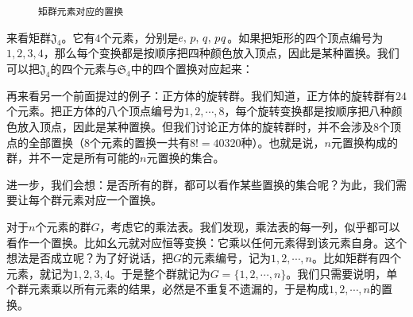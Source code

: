 \documentclass[12pt,UTF8,fontset=none]{ctexbook}
\begin{document}
\begin{figure}[htbp]
    \caption{\texttt{矩群元素对应的置换}}
    \label{fig:PermutationRecta}
\end{figure}
\vspace{12pt}

来看矩群$\mathfrak{J}_4$。它有$4$个元素，分别是$e,\, p, \,q,\, p\hspace{0.5pt}q$。如果把矩形的四个顶点编号为$1,2,3,4$，那么每个变换都是按顺序把四种颜色放入顶点，因此是某种置换。我们可以把$\mathfrak{J}_4$的四个元素与$\mathfrak{S}_4$中的四个置换对应起来：

再来看另一个前面提过的例子：正方体的旋转群。我们知道，正方体的旋转群有$24$个元素。把正方体的八个顶点编号为$1,2,\cdots,8$，每个旋转变换都是按顺序把八种颜色放入顶点，因此是某种置换。但我们讨论正方体的旋转群时，并不会涉及$8$个顶点的全部置换（$8$个元素的置换一共有$8! = 40320$种）。也就是说，$n$元置换构成的群，并不一定是所有可能的$n$元置换的集合。

进一步，我们会想：是否所有的群，都可以看作某些置换的集合呢？为此，我们需要让每个群元素对应一个置换。

对于$n$个元素的群$G$，考虑它的乘法表。我们发现，乘法表的每一列，似乎都可以看作一个置换。比如幺元就对应恒等变换：它乘以任何元素得到该元素自身。这个想法是否成立呢？为了好说话，把$G$的元素编号，记为$1,2,\cdots,n$。比如矩群有四个元素，就记为$1,2,3,4$。于是整个群就记为$G =\{1,2,\cdots,n\}$。我们只需要说明，单个群元素乘以所有元素的结果，必然是不重复不遗漏的，于是构成$1,2,\cdots,n$的置换。
\end{document}
